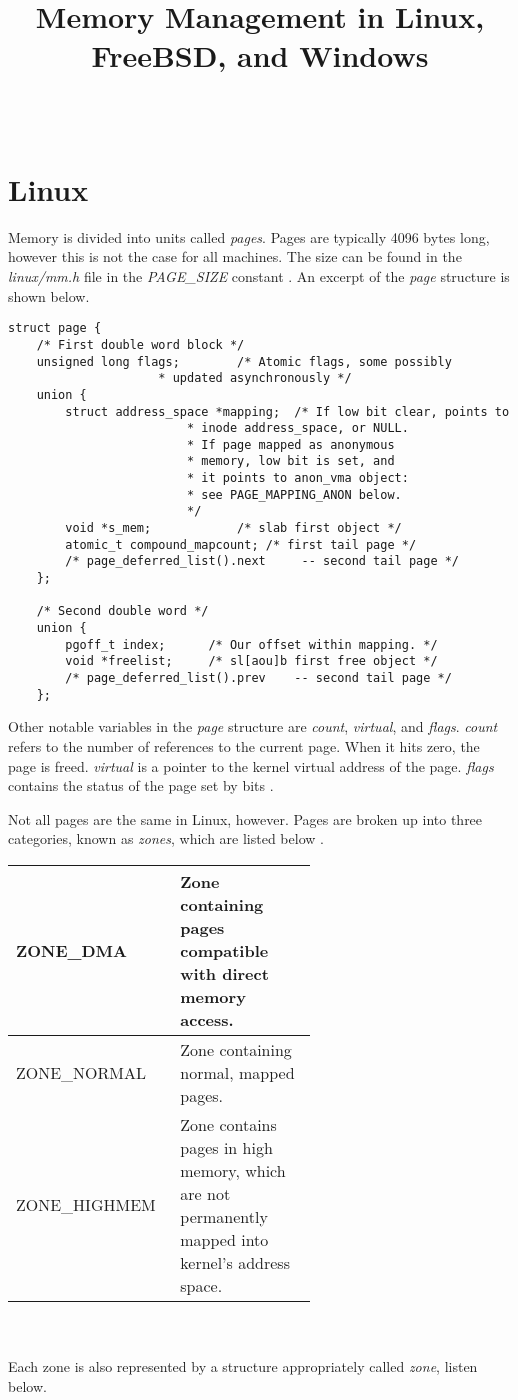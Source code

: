\documentclass[10pt,draftclsnofoot,onecolumn,journal,compsoc]{IEEEtran}
\title{Memory Management in Linux, FreeBSD, and Windows}
\author{
  \IEEEauthorblockN{Heidi Clayton} \\
  \IEEEauthorblockA{CS 444: Operating Systems II Spring 2017 \\ Oregon State University}
}
\begin{document}
\maketitle
\newpage
\tableofcontents
\newpage
\section{Linux}
Memory is divided into units called \textit{pages}. Pages are typically 4096 bytes long, however this is not the case for all machines. The size can be found in the \textit{linux/mm.h} file in the \textit{PAGE\_SIZE} constant \cite{linux}. An excerpt of the \textit{page} structure is shown below.
 
\begin{lstlisting}[caption={An excerpt from the \textit{page} structure in the linux/mm.h file.}]
struct page {
	/* First double word block */
	unsigned long flags;		/* Atomic flags, some possibly
					 * updated asynchronously */
	union {
		struct address_space *mapping;	/* If low bit clear, points to
						 * inode address_space, or NULL.
						 * If page mapped as anonymous
						 * memory, low bit is set, and
						 * it points to anon_vma object:
						 * see PAGE_MAPPING_ANON below.
						 */
		void *s_mem;			/* slab first object */
		atomic_t compound_mapcount;	/* first tail page */
		/* page_deferred_list().next	 -- second tail page */
	};

	/* Second double word */
	union {
		pgoff_t index;		/* Our offset within mapping. */
		void *freelist;		/* sl[aou]b first free object */
		/* page_deferred_list().prev	-- second tail page */
	};
\end{lstlisting}
Other notable variables in the \textit{page} structure are \textit{count}, \textit{virtual}, and \textit{flags}. \textit{count} refers to the number of references to the current page. When it hits zero, the page is freed. \textit{virtual} is a pointer to the kernel virtual address of the page. \textit{flags} contains the status of the page set by bits \cite{linux}. 

Not all pages are the same in Linux, however. Pages are broken up into three categories, known as \textit{zones}, which are listed below \cite{linux}. \\

\begin{tabular}{ | p{0.2\linewidth} | p{0.4\linewidth} |}
    \hline
    ZONE\_DMA & Zone containing pages compatible with direct memory access.\\ \hline
    ZONE\_NORMAL & Zone containing normal, mapped pages.\\ \hline
    ZONE\_HIGHMEM & Zone contains pages in high memory, which are not permanently 		mapped into kernel's address space.\\ \hline
\end{tabular} \\ \\ 
Each zone is also represented by a structure appropriately called \textit{zone}, listen below.
\end{document}
